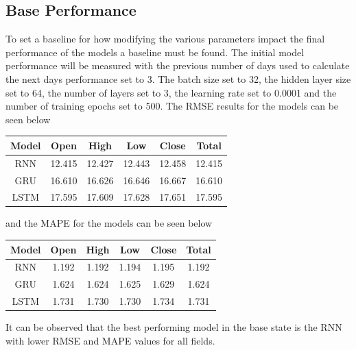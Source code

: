 \documentclass[10pt,twocolumn,letterpaper]{article}
\begin{document}
\subsection{Base Performance}
To set a baseline for how modifying the various parameters impact the final performance 
of the models a baseline must be found. The initial model performance will be measured 
with the previous number of days used to calculate the next days performance set to 3.
The batch size set to 32, the hidden layer size set to 64, the number of layers set to 3,
the learning rate set to 0.0001 and the number of training epochs set to 500. 
The RMSE results for the models can be seen below
\begin{center}
   \begin{tabular}{||c c c c c c||} 
    \hline
    Model & Open & High & Low & Close & Total\\ [0.5ex] 
    \hline\hline
    RNN  & 12.415 & 12.427 & 12.443 & 12.458& 12.415\\ 
    \hline
    GRU  & 16.610 & 16.626 & 16.646 & 16.667& 16.610\\ 
    \hline
    LSTM  & 17.595 & 17.609 & 17.628 &  17.651& 17.595\\ 
    \hline
   \end{tabular}
\end{center}
and the MAPE for the models can be seen below
\begin{center}
\begin{tabular}{||c c c c c c||} 
 \hline
 Model & Open & High & Low & Close & Total\\ [0.5ex] 
 \hline\hline
 RNN  & 1.192 & 1.192 & 1.194 & 1.195& 1.192\\ 
 \hline
 GRU  & 1.624 & 1.624 & 1.625 &  1.629& 1.624\\ 
 \hline
 LSTM  & 1.731 & 1.730 & 1.730 & 1.734& 1.731\\ 
 \hline
\end{tabular}
\end{center}
It can be observed that the best performing model in the base state is the RNN with lower 
RMSE and MAPE values for all fields.
\end{document}
